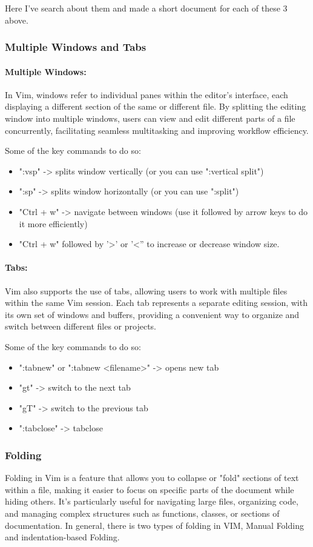 \documentclass{article}
\begin{document}
	Here I've search about them and made a short document for each of these 3 above.

	\subsubsection{Multiple Windows and Tabs}
	\paragraph{Multiple Windows:} In Vim, windows refer to individual panes within the editor's interface, each displaying a different section of the same or different file.
	By splitting the editing window into multiple windows, users can view and edit different parts of a file concurrently, facilitating seamless multitasking and improving workflow efficiency.

	Some of the key commands to do so:
	\begin{itemize}
		\item ":vsp" -> splits window vertically (or you can use ":vertical split")
		\item ":sp" -> splits window horizontally (or you can use ":split")
		\item "Ctrl + w" -> navigate between windows (use it followed by arrow keys to do it more efficiently)
		\item "Ctrl + w" followed by '>' or '<'' to increase or decrease window size.
	\end{itemize}

	\paragraph{Tabs:} Vim also supports the use of tabs, allowing users to work with multiple files within the same Vim session.
	Each tab represents a separate editing session, with its own set of windows and buffers, providing a convenient way to organize and
	switch between different files or projects.

	Some of the key commands to do so:
	\begin{itemize}
		\item ":tabnew" or ":tabnew <filename>" -> opens new tab
		\item "gt" -> switch to the next tab
		\item "gT" -> switch to the previous tab
		\item ":tabclose" -> tabclose
	\end{itemize}

	\subsubsection{Folding}
	Folding in Vim is a feature that allows you to collapse or "fold" sections of text within a file, making it easier to focus on specific parts of the document while hiding others.
	It's particularly useful for navigating large files, organizing code, and managing complex structures such as functions, classes, or sections of documentation.
	In general, there is two types of folding in VIM, Manual Folding and indentation-based Folding.
\end{document}
